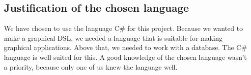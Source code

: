 
\subsection{Justification of the chosen language}
We have chosen to use the language C\# for this project. Because we wanted to make a graphical DSL, we needed a language that is suitable for making graphical applications. Above that, we needed to work with a database. The C\# language is well suited for this. A good knowledge of the chosen language wasn't a priority, because only one of us knew the language well.
